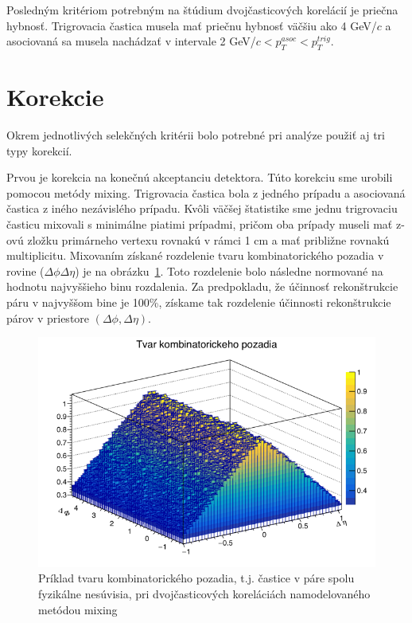 \documentclass[thesismargins, thesislinespacing]{rnthesis}
\begin{document}
Posledným kritériom potrebným na štúdium dvojčasticových korelácií je priečna hybnosť. Trigrovacia častica musela mať priečnu hybnosť väčšiu ako 4 GeV/$c$ a asociovaná sa musela nachádzať v intervale 2 GeV/$c<p_T^{asoc}<p_T^{trig}$.

\section{Korekcie}
Okrem jednotlivých selekčných kritérii bolo potrebné pri analýze použiť aj tri typy korekcií. 

Prvou je korekcia na konečnú akceptanciu detektora. Túto korekciu sme urobili pomocou metódy mixing. Trigrovacia častica bola z jedného prípadu a asociovaná častica z iného nezávislého prípadu. Kvôli väčšej štatistike sme jednu trigrovaciu časticu mixovali s minimálne piatimi prípadmi, pričom oba prípady museli mať z-ovú zložku primárneho vertexu rovnakú v rámci 1 cm a mať približne rovnakú multiplicitu. Mixovaním získané rozdelenie tvaru kombinatorického pozadia v rovine ($\Delta \phi \Delta \eta$) je na obrázku~\ref{pozadie}. Toto rozdelenie bolo následne normované na hodnotu najvyššieho binu rozdalenia. Za predpokladu, že účinnosť rekonštrukcie páru v najvyššom bine je 100\%, získame tak rozdelenie účinnosti rekonštrukcie párov v priestore $(\Delta \phi,\Delta\eta)$.

\begin{figure}[hbtp!]
	\centering
	\includegraphics[scale=0.5]{./Obrazky_praca/pozadie.png}
	\caption{Príklad tvaru kombinatorického pozadia, t.j. častice v páre spolu fyzikálne nesúvisia, pri dvojčasticových koreláciách namodelovaného metódou mixing}
	\label{pozadie}
\end{figure}
\end{document}
